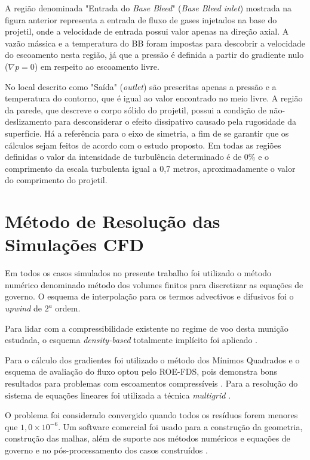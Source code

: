 A região denominada "Entrada do \textit{Base Bleed}"{} (\textit{Base Bleed inlet}) mostrada na figura anterior representa a entrada de fluxo de gases injetados na base do projetil, onde a velocidade de entrada possui valor apenas na direção axial. A vazão mássica e a temperatura do BB foram impostas para descobrir a velocidade do escoamento nesta região, já que a pressão é definida a partir do gradiente nulo ($\nabla p = 0$) em respeito ao escoamento livre.

No local descrito como "Saída"{} (\textit{outlet}) são prescritas apenas a pressão e a temperatura do contorno, que é igual ao valor encontrado no meio livre. A região da parede, que descreve o corpo sólido do projetil, possui a condição de não-deslizamento para desconsiderar o efeito dissipativo causado pela rugosidade da superfície. Há a referência para o eixo de simetria, a fim de se garantir que os cálculos sejam feitos de acordo com o estudo proposto. Em todas as regiões definidas o valor da intensidade de turbulência determinado é de 0\% e o comprimento da escala turbulenta igual a 0,7 metros, aproximadamente o valor do comprimento do projetil.

\section{Método de Resolução das Simulações CFD}\label{sec:metodo-resolucao-cfd}

Em todos os casos simulados no presente trabalho foi utilizado o método numérico denominado método dos volumes finitos \cite{McDonald1971,MacComarck&Paulay1972} para discretizar as equações de governo. O esquema de interpolação para os termos advectivos e difusivos foi o \textit{upwind} de $2^{a}$ ordem. 

Para lidar com a compressibilidade existente no regime de voo desta munição estudada, o esquema \textit{density-based} totalmente implícito foi aplicado \cite{Weiss1995PreconditioningAT,Weiss1997IMPLICITSO,Weiss1999ImplicitSO}.

Para o cálculo dos gradientes foi utilizado o método dos Mínimos Quadrados e o esquema de avaliação do fluxo optou pelo ROE-FDS, pois demonstra bons resultados para problemas com escoamentos compressíveis \cite{nicolas-perez_accuracy_2017}. Para a resolução do sistema de equações lineares foi utilizada a técnica \textit{multigrid} \cite{Hutchinson1986}.

O problema foi considerado convergido quando todos os resíduos forem menores que $1,0 \times 10^{-6}$. Um software comercial foi usado para a construção da geometria, construção das malhas, além de suporte aos métodos numéricos e equações de governo e no pós-processamento dos casos construídos \cite{fluent2021ansys}.

